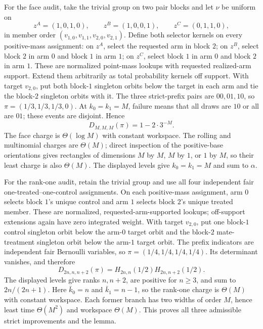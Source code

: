 For the face audit, take the trivial group on two pair blocks and let \(\nu\) be uniform on
\[
z^A=(1,0,1,0),\qquad z^B=(1,0,0,1),\qquad z^C=(0,1,1,0),
\tag{8}
\]
in member order \((v_{1,0},v_{1,1},v_{2,0},v_{2,1})\). Define both selector kernels on every positive-mass assignment: on \(z^A\), select the requested arm in block \(2\); on \(z^B\), select block \(2\) in arm \(0\) and block \(1\) in arm \(1\); on \(z^C\), select block \(1\) in arm \(0\) and block \(2\) in arm \(1\). These are normalized point-mass lookups with requested realized-arm support. Extend them arbitrarily as total probability kernels off support. With target \(v_{2,0}\), put both block-\(1\) singleton orbits below the target in each arm and tie the block-\(2\) singleton orbits with it. The three strict-prefix pairs are \(00,01,10\), so \(\pi=(1/3,1/3,1/3,0)\). At \(k_0=k_1=M\), failure means that all draws are \(10\) or all are \(01\); these events are disjoint. Hence
\[
D_{M,M,M}(\pi)=1-2\cdot3^{-M}.
\]
The face charge is \(\Theta(\log M)\) with constant workspace. The rolling and multinomial charges are \(\Theta(M)\); direct inspection of the positive-base orientations gives rectangles of dimensions \(M\) by \(M\), \(M\) by \(1\), or \(1\) by \(M\), so their least charge is also \(\Theta(M)\). The displayed levels give \(k_0=k_1=M\) and sum to \(\alpha\).

For the rank-one audit, retain the trivial group and use all four independent fair one-treated--one-control assignments. On each positive-mass assignment, arm \(0\) selects block \(1\)'s unique control and arm \(1\) selects block \(2\)'s unique treated member. These are normalized, requested-arm-supported lookups; off-support extensions again have zero integrated weight. With target \(v_{2,0}\), put one block-\(1\) control singleton orbit below the arm-\(0\) target orbit and the block-\(2\) mate-treatment singleton orbit below the arm-\(1\) target orbit. The prefix indicators are independent fair Bernoulli variables, so \(\pi=(1/4,1/4,1/4,1/4)\). Its determinant vanishes, and therefore
\[
D_{2n,n,n+2}(\pi)=H_{2n,n}(1/2)H_{2n,n+2}(1/2).
\]
The displayed levels give ranks \(n,n+2\), are positive for \(n\ge3\), and sum to \(2n/(2n+1)\). Here \(\bar k_0=n\) and \(\bar k_1=n-1\), so the rank-one charge is \(\Theta(M)\) with constant workspace. Each former branch has two widths of order \(M\), hence least time \(\Theta(M^2)\) and workspace \(\Theta(M)\). This proves all three admissible strict improvements and the lemma.